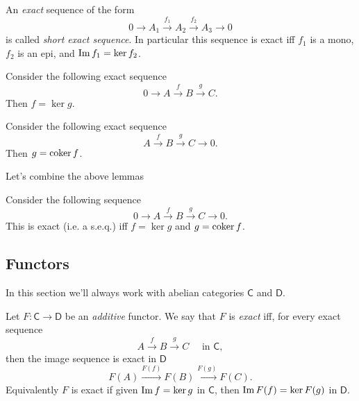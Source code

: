 \begin{defn}
	An {\em exact} sequence of the form
	\begin{equation}
	0 \to A_1 \xrightarrow{f_1} A_2 \xrightarrow{f_2} A_3 \to 0 
	\end{equation} 
	is called {\em short exact sequence}.
	In particular this sequence is exact iff
	$f_1$ is a mono, $f_2$ is an epi, and $\operatorname{Im} f_1 = \ker f_2$.
\end{defn}

\begin{lem}
	Consider the following exact sequence
	\begin{equation}
	0 \to A \xrightarrow{f} B \xrightarrow{g} C
	.\end{equation} 
	Then $f = \ker g$.
\end{lem} 

\begin{lem}
	Consider the following exact sequence
	\begin{equation}
	A \xrightarrow{f} B \xrightarrow{g} C \to 0
	.\end{equation} 
	Then $g = \operatorname{coker} f$.
\end{lem} 
Let's combine the above lemmas

\begin{prop}
	Consider the following sequence
	\begin{equation}
	0 \to A \xrightarrow{f} B \xrightarrow{g} C \to 0
	.\end{equation} 
	This is exact (i.e. a s.e.q.) iff $f = \ker g$ and $g = \operatorname{coker} f$.
\end{prop} 

\subsection{Functors}
In this section we'll always work with abelian categories $\mathsf{C}$ and $\mathsf{D}$.

\begin{defn}
	Let $F\colon \mathsf{C} \to \mathsf{D}$ be an {\em additive} functor.
	We say that $F$ is {\em exact} iff, for every exact sequence
	\begin{equation}
	A \xrightarrow{f} B \xrightarrow{g} C \quad \text{ in } \mathsf{C}
	,\end{equation} 
	then the image sequence is exact in $\mathsf{D}$ 
	\begin{equation}
	F(A) \xrightarrow{F(f)} F(B) \xrightarrow{F(g)} F(C)
	.\end{equation} 
	Equivalently $F$ is exact if given $\operatorname{Im} f = \ker g$ in $\mathsf{C}$, then
	$\operatorname{Im} F(f) = \ker F(g)$ in $\mathsf{D}$.
\end{defn}

